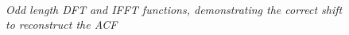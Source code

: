 \documentclass[./main.tex]{subfiles}
\begin{document}
\begin{figure}[h]
	\centering
	\begin{subfigure}[b]{0.49\textwidth}
		\resizebox{\textwidth}{!}{}
		\label{fig:1_2_d_dft_odd}
	\end{subfigure}
	~ %
	\begin{subfigure}[b]{0.49\textwidth}
		\resizebox{\textwidth}{!}{}
		\label{fig:1_2_d_ifft_odd}
	\end{subfigure}
	\label{fig:1_2_d_ifft}
	\caption{\textit{Odd length DFT and IFFT functions, demonstrating the correct shift to reconstruct the ACF}}
\end{figure}
\end{document}
